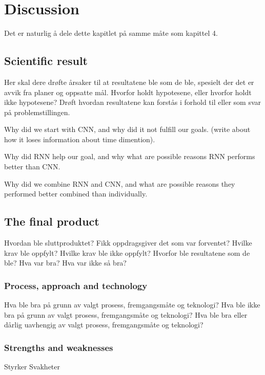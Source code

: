 \chapter{Discussion}

Det er naturlig å dele dette kapitlet på samme måte som kapittel 4.

\section{Scientific result}

Her skal dere drøfte årsaker til at resultatene ble som de ble, spesielt der det er avvik fra planer og oppsatte mål. 
Hvorfor holdt hypotesene, eller hvorfor holdt ikke hypotesene? 
Drøft hvordan resultatene kan forstås i forhold til eller som svar på problemstillingen.

Why did we start with CNN, and why did it not fulfill our goals.
(write about how it loses information about time dimention).

Why did RNN help our goal, and why what are possible reasons RNN performs better than CNN.

Why did we combine RNN and CNN, and what are possible reasons they performed better combined than individually.

\subsection{}

\section{The final product}

Hvordan ble sluttproduktet? 
Fikk oppdragsgiver det som var forventet? 
Hvilke krav ble oppfylt? 
Hvilke krav ble ikke oppfylt? 
Hvorfor ble resultatene som de ble?
Hva var bra?
Hva var ikke så bra? 

\subsection{Process, approach and technology}

Hva ble bra på grunn av valgt prosess, fremgangsmåte og teknologi? 
Hva ble ikke bra på grunn av valgt prosess, fremgangsmåte og teknologi? 
Hva ble bra eller dårlig uavhengig av valgt prosess, fremgangsmåte og teknologi?

\subsection{Strengths and weaknesses}
Styrker
Svakheter


